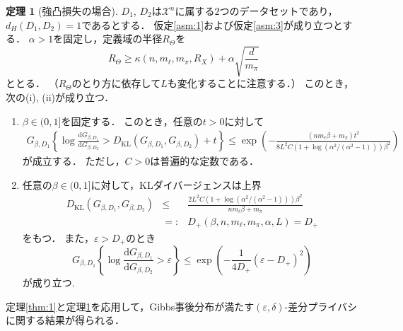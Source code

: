 \documentclass{jarticle}
\newcommand{\dd}{\mathrm{d}}
\theoremstyle{definition}
\newtheorem{thm}{定理}
\begin{document}
\begin{thm}[強凸損失の場合]
\label{thm:2}
$D_1$, $D_2$は$\mathcal{X}^n$に属する$2$つのデータセットであり，$d_H(D_1, D_2)=1$であるとする．
仮定\ref{asm:1}および仮定\ref{asm:3}が成り立つとする．
$\alpha > 1$を固定し，定義域の半径$R_\Theta$を
\begin{equation}
R_\Theta \geq \kappa(n, m_\ell, m_\pi, R_X) + \alpha \sqrt{\frac{d}{m_\pi}}
\end{equation}
ととる．
（$R_\Theta$のとり方に依存して$L$も変化することに注意する．）
このとき，次の(i), (ii)が成り立つ．
\begin{enumerate}
\renewcommand{\labelenumi}{(\roman{enumi})}
\item $\beta \in (0, 1]$を固定する．
このとき，任意の$t>0$に対して
\begin{align}
G_{\beta, D_1} \left \{
\log \frac{\dd G_{\beta, D_1}}{\dd G_{\beta, D_2}} > D_{\mathrm{KL}}(G_{\beta, D_1}, G_{\beta, D_2}) + t
\right \}
\leq
\exp \left(
- \frac{(nm_\ell \beta + m_\pi) t^2}{8L^2 C(1+\log(\alpha^2/(\alpha^2-1)))\beta^2}
\right)
\label{eq:thm2_1}
\end{align} 
が成立する．
ただし，$C>0$は普遍的な定数である．

\item 任意の$\beta \in (0, 1]$に対して，KLダイバージェンスは上界
\begin{align}
D_{\mathrm{KL}}(G_{\beta, D_1}, G_{\beta, D_2}) &\leq&
\frac{2 L^2 C(1+\log(\alpha^2/(\alpha^2-1))) \beta^2}{nm_\ell \beta + m_\pi}　\nonumber \\
& =:& D_{+}(\beta, n, m_\ell, m_\pi, \alpha, L) = D_{+}
\label{eq:thm2_2}
\end{align}
をもつ．
また，$\varepsilon > D_+$のとき
\begin{equation}
G_{\beta, D_1} \left \{
\log \frac{\dd G_{\beta, D_1}}{\dd G_{\beta, D_2}} > \varepsilon
\right \}
\leq
\exp \left(
- \frac{1}{4D_+}
\left(
\varepsilon - D_+
\right)^2
\right)
\label{eq:thm2_3}
\end{equation}
が成り立つ.
\end{enumerate}
\end{thm}

定理\ref{thm:1}と定理\ref{thm:2}を応用して，Gibbs事後分布が満たす$(\varepsilon, \delta)$-差分プライバシ
に関する結果が得られる．
\end{document}
